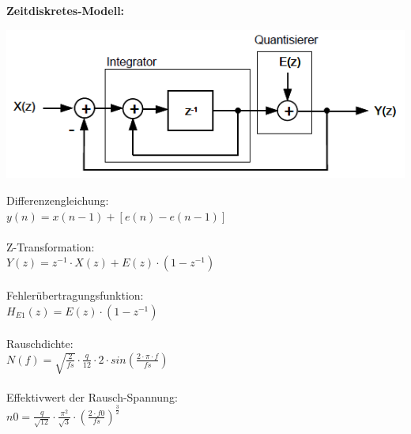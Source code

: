 \textbf{Zeitdiskretes-Modell:}\\
\begin{minipage}{0.45\textwidth}
    \includegraphics[width=1.0\textwidth]{images/SigmaDeltaZeitdiskretesModell}
\end{minipage}
\hfill
\begin{minipage}{0.45\textwidth}
    Differenzengleichung:\\ $y(n) = x(n-1)+[e(n)-e(n-1)]$\\\\
    Z-Transformation:\\ $Y(z)=z^{-1}\cdot X(z)+E(z)\cdot (1-z^{-1})$\\\\
    Fehlerübertragungsfunktion:\\
    $H_{E1}(z) = E(z) \cdot (1-z^{-1})$\\\\
    Rauschdichte:\\ $N(f)=\sqrt{\frac{2}{fs}}\cdot \frac{q}{12} \cdot 2 \cdot sin(\frac{2 \cdot \pi \cdot f}{fs})$\\\\
    Effektivwert der Rausch-Spannung:\\
    $n0=\frac{q}{\sqrt{12}}\cdot \frac{\pi ^2}{\sqrt{3}}\cdot (\frac{2 \cdot f0}{fs})^\frac{3}{2}$
\end{minipage}



